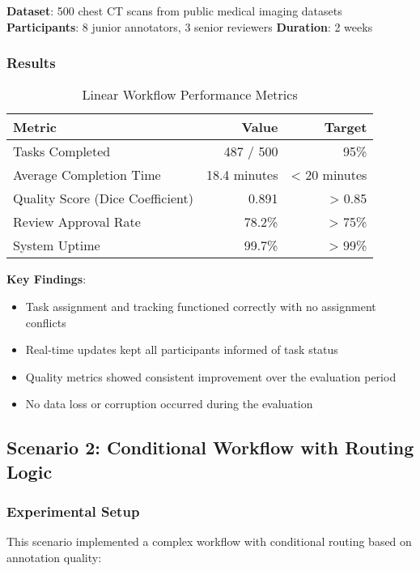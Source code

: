 \textbf{Dataset}: 500 chest CT scans from public medical imaging datasets
\textbf{Participants}: 8 junior annotators, 3 senior reviewers
\textbf{Duration}: 2 weeks

\subsubsection{Results}

\begin{table}[htbp]
\centering
\caption{Linear Workflow Performance Metrics}
\label{tab:linear-workflow-results}
\begin{tabular}{|l|r|r|}
\hline
\textbf{Metric} & \textbf{Value} & \textbf{Target} \\
\hline
Tasks Completed & 487 / 500 & 95\% \\
Average Completion Time & 18.4 minutes & < 20 minutes \\
Quality Score (Dice Coefficient) & 0.891 & > 0.85 \\
Review Approval Rate & 78.2\% & > 75\% \\
System Uptime & 99.7\% & > 99\% \\
\hline
\end{tabular}
\end{table}

\textbf{Key Findings}:
\begin{itemize}
    \item Task assignment and tracking functioned correctly with no assignment conflicts
    \item Real-time updates kept all participants informed of task status
    \item Quality metrics showed consistent improvement over the evaluation period
    \item No data loss or corruption occurred during the evaluation
\end{itemize}

\subsection{Scenario 2: Conditional Workflow with Routing Logic}
\label{subsec:scenario-conditional}

\subsubsection{Experimental Setup}

This scenario implemented a complex workflow with conditional routing based on annotation quality:


